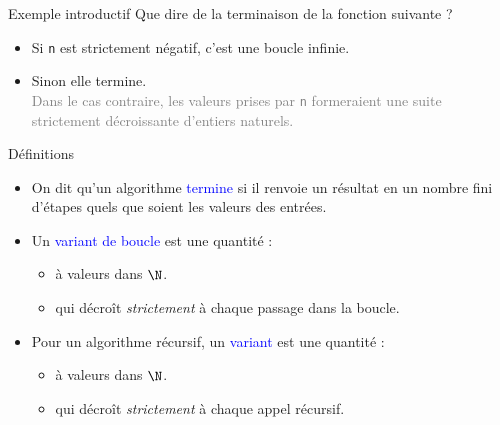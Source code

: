 \documentclass[10pt]{beamer}
\begin{document}
\begin{frame}[fragile]{\Ctitle}{\stitle}
\begin{exampleblock}{Exemple introductif}
    Que dire de la terminaison de la fonction suivante ?
    \begin{itemize}
        \item<2-> \textcolor{OliveGreen}{Si {\tt n} est strictement négatif, c'est une boucle infinie.\\}
        \item<4-> \textcolor{OliveGreen}{Sinon  elle termine.\\}
        \textcolor{gray}{\small Dans le cas contraire, les valeurs prises par {\tt n} formeraient une suite strictement décroissante d'entiers naturels.}
    \end{itemize}
\end{exampleblock}
\end{frame}


\begin{frame}[fragile]{\Ctitle}{\stitle}
\begin{block}{Définitions}
    \begin{itemize}
        \item<2-> On dit qu'un algorithme \textcolor{blue}{termine} si il renvoie un résultat en un nombre fini d'étapes quels que soient les valeurs des entrées.
        \item<3-> Un \textcolor{blue}{variant de boucle} est une quantité :
            \begin{itemize}
            \item<4-> à valeurs dans $\N$.
            \item<5-> qui décroît \textit{strictement} à chaque passage dans la boucle.
            \end{itemize}
        \item<6-> Pour un algorithme récursif, un \textcolor{blue}{variant} est une quantité :
        \begin{itemize}
            \item<7-> à valeurs dans $\N$.
            \item<8-> qui décroît \textit{strictement} à chaque appel récursif.
        \end{itemize}
    \end{itemize}
\end{block}
\end{frame}
\end{document}
